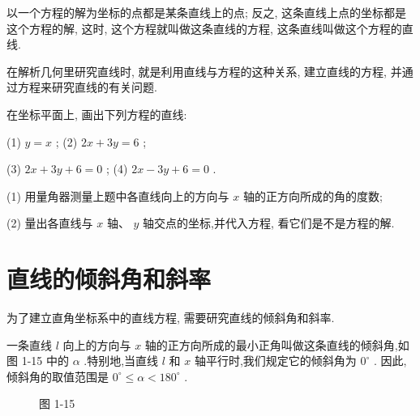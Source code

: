 \documentclass[lang=cn,newtx,10.5pt,scheme=chinese]{elegantbook}
\begin{document}
\begin{corollary}[直线与方程的关系]
以一个方程的解为坐标的点都是某条直线上的点; 反之, 这条直线上点的坐标都是这个方程的解, 这时, 这个方程就叫做这条直线的方程, 这条直线叫做这个方程的直线.
\end{corollary}

在解析几何里研究直线时, 就是利用直线与方程的这种关系, 建立直线的方程, 并通过方程来研究直线的有关问题.

\begin{problemset}[练习]

\item 在坐标平面上, 画出下列方程的直线:

(1) \(y = x\) ; (2) \({2x} + {3y} = 6\) ;

(3) \({2x} + {3y} + 6 = 0\) ; (4) \({2x} - {3y} + 6 = 0\) .

\item (1) 用量角器测量上题中各直线向上的方向与 \(x\) 轴的正方向所成的角的度数;

(2) 量出各直线与 \(x\) 轴、 \(y\) 轴交点的坐标,并代入方程, 看它们是不是方程的解.
\end{problemset}

\section{直线的倾斜角和斜率}

为了建立直角坐标系中的直线方程, 需要研究直线的倾斜角和斜率.

\begin{definition}[倾斜角]
一条直线 \(l\) 向上的方向与 \(x\) 轴的正方向所成的最小正角叫做这条直线的倾斜角,如图 1-15 中的 \(\alpha\) .特别地,当直线 \(l\) 和 \(x\) 轴平行时,我们规定它的倾斜角为 \({0}^{ \circ }\) . 因此,倾斜角的取值范围是 \({0}^{ \circ } \leq \alpha < {180}^{ \circ }\) .
\end{definition}

\begin{figure}[h]
	\centering
	\begin{subfigure}[h]{0.45\textwidth}
		\centering
		
	\end{subfigure}
	\hfill %
	\begin{subfigure}[h]{0.45\textwidth}
		\centering
		
	\end{subfigure}
	\caption{图 1-15}
\end{figure}
\end{document}
